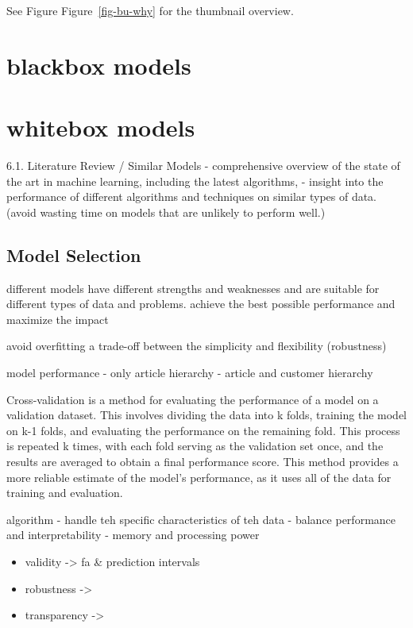 \documentclass[
  american,
  10,
  a4paper,
]{book}
\providecommand{\tightlist}{%
  \setlength{\itemsep}{0pt}\setlength{\parskip}{0pt}}
\theoremstyle{definition}
\theoremstyle{remark}
\begin{document}
See Figure Figure~\ref{fig-bu-why} for the thumbnail overview.

\section{blackbox models}\label{blackbox-models}

\section{whitebox models}\label{whitebox-models}

6.1. Literature Review / Similar Models - comprehensive overview of the
state of the art in machine learning, including the latest algorithms, -
insight into the performance of different algorithms and techniques on
similar types of data. (avoid wasting time on models that are unlikely
to perform well.)

\subsection{Model Selection}\label{model-selection}

different models have different strengths and weaknesses and are
suitable for different types of data and problems. achieve the best
possible performance and maximize the impact

avoid overfitting a trade-off between the simplicity and flexibility
(robustness)

model performance - only article hierarchy - article and customer
hierarchy

Cross-validation is a method for evaluating the performance of a model
on a validation dataset. This involves dividing the data into k folds,
training the model on k-1 folds, and evaluating the performance on the
remaining fold. This process is repeated k times, with each fold serving
as the validation set once, and the results are averaged to obtain a
final performance score. This method provides a more reliable estimate
of the model's performance, as it uses all of the data for training and
evaluation.

algorithm - handle teh specific characteristics of teh data - balance
performance and interpretability - memory and processing power

\begin{itemize}
\tightlist
\item
  validity -\textgreater{} fa \& prediction intervals
\item
  robustness -\textgreater{}
\item
  transparency -\textgreater{}
\end{itemize}
\end{document}
